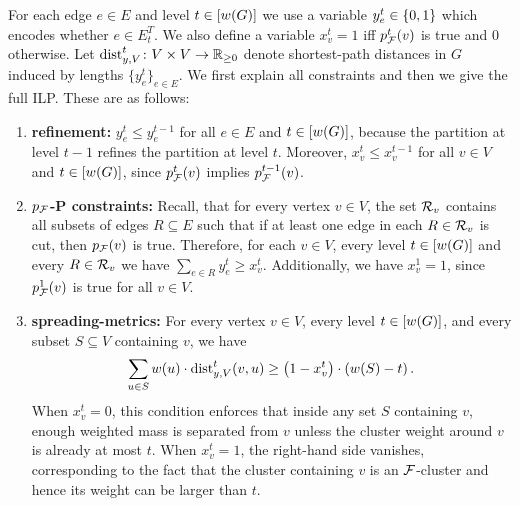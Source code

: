    For each edge $e\in E$ and level $t\in [w\mathopen{}\left( G \right)]$ we use a variable $y_e^t\in\mathopen{}\left\{ 0,1 \right\}$ which encodes whether $e\in E_t^T$.
    We also define a variable $x_v^t=1$ iff $p_{\mathcal{F}}^t\mathopen{}\left( v \right)$ is true and $0$ otherwise.  Let $\text{dist}_{y, V}^{t}\colon V\times V\to \mathbb{R}_{\geq 0}$ denote shortest-path distances in $G$ induced by lengths $\{y_e^t\}_{e\in E}$.
    We first explain all constraints and then we give the full ILP.
    These are as follows:
    \begin{enumerate}
        \item \textbf{refinement:} $y_{e}^t \leq y_{e}^{t-1}$ for all $e\in E$ and $t\in [w\mathopen{}\left( G \right)]$, because the partition at level $t-1$ refines the partition at level $t$. Moreover, $x_v^t \leq x_v^{t-1}$ for all $v\in V$ and $t\in [w\mathopen{}\left( G \right)]$, since $p_{\mathcal{F}}^t\mathopen{}\left( v \right)$ implies $p_{\mathcal{F}}^{t-1}\mathopen{}\left( v \right)$.

        \item \textbf{$p_{\mathcal{F}}$-P constraints:} Recall, that for every vertex $v\in V$, the set $\mathcal{R}_v$ contains all subsets of edges $R\subseteq E$ such that if at least one edge in each $R\in \mathcal{R}_v$ is cut, then $p_{\mathcal{F}}\mathopen{}\left( v \right)$ is true. Therefore, for each $v\in V$, every level $t\in [w\mathopen{}\left( G \right)]$ and every $R\in \mathcal{R}_v$ we have $\sum_{e\in R} y_e^t \geq x_{v}^t$. Additionally, we have $x_v^1=1$, since $p_{\mathcal{F}}^1\mathopen{}\left( v \right)$ is true for all $v\in V$.

        \item \textbf{spreading-metrics:} For every vertex $v\in V$, every level $t\in [w\mathopen{}\left( G \right)]$, and every subset $S\subseteq V$ containing $v$, we have
        \[
            \sum_{u\in S} w(u)\cdot \text{dist}_{y, V}^{t}(v,u) \geq \mathopen{}\left( 1-x_v^t \right)\cdot \mathopen{}\left( w\mathopen{}\left( S \right)-t \right).
        \]
        When $x_v^t=0$, this condition enforces that inside any set $S$ containing $v$, enough weighted mass is separated from $v$ unless the cluster weight around $v$ is already at most $t$. When $x_v^t=1$, the right-hand side vanishes, corresponding to the fact that the cluster containing $v$ is an $\mathcal{F}$-cluster and hence its weight can be larger than $t$.
    \end{enumerate}

